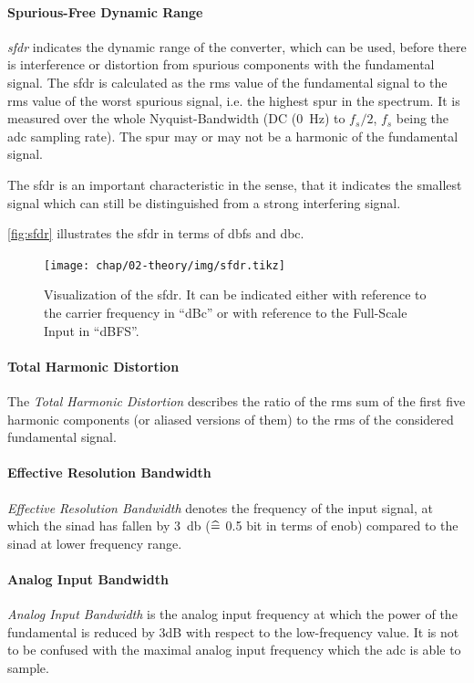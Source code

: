 \paragraph{Spurious-Free Dynamic Range}
\textit{\gls{sfdr}} indicates the dynamic range of the converter, which can be used, before there is interference or distortion from spurious components with the fundamental signal. \cite{Lundberg} The \gls{sfdr} is calculated as the \gls{rms} value of the fundamental signal to the \gls{rms} value of the worst spurious signal, i.e. the highest spur in the spectrum. It is measured over the whole Nyquist-Bandwidth (DC (\SI{0}{\hertz}) to $f_s/2$, $f_s$ being the \gls{adc} sampling rate). The spur may or may not be a harmonic of the fundamental signal. \cite{walt2009} \cite{Lundberg}

The \gls{sfdr} is an important characteristic in the sense, that it indicates the smallest signal which can still be distinguished from a strong interfering signal. \cite{walt2009} 

\autoref{fig:sfdr} illustrates the \gls{sfdr} in terms of \gls{dbfs} and \gls{dbc}.

\begin{figure}[tbh]
	\centering
	\texttt{[image: chap/02-theory/img/sfdr.tikz]}
	\caption[SFDR definition]{Visualization of the \gls{sfdr}. It can be indicated either with reference to the carrier frequency in ``dBc'' or with reference to the Full-Scale Input in ``dBFS''. \cite{walt2009}}
	\label{fig:sfdr}
\end{figure}
\paragraph{Total Harmonic Distortion}
The \textit{Total Harmonic Distortion} describes the ratio of the \gls{rms} sum of the first five harmonic components (or aliased versions of them) to the \gls{rms} of the considered fundamental signal. \cite{Lundberg}

\paragraph{Effective Resolution Bandwidth}
\textit{Effective Resolution Bandwidth} denotes the frequency of the input signal, at which the \gls{sinad} has fallen by \SI{3}{\decibel} ($\mathrel{\widehat{=}}$ 0.5 bit in terms of \gls{enob}) compared to the \gls{sinad} at lower frequency range. \cite{Lundberg}

\paragraph{Analog Input Bandwidth}
\textit{Analog Input Bandwidth} is the analog input frequency at which the power of the fundamental is reduced by 3dB with respect to the low-frequency value. \cite{Lundberg} It is not to be confused with the maximal analog input frequency which the \gls{adc} is able to sample.

